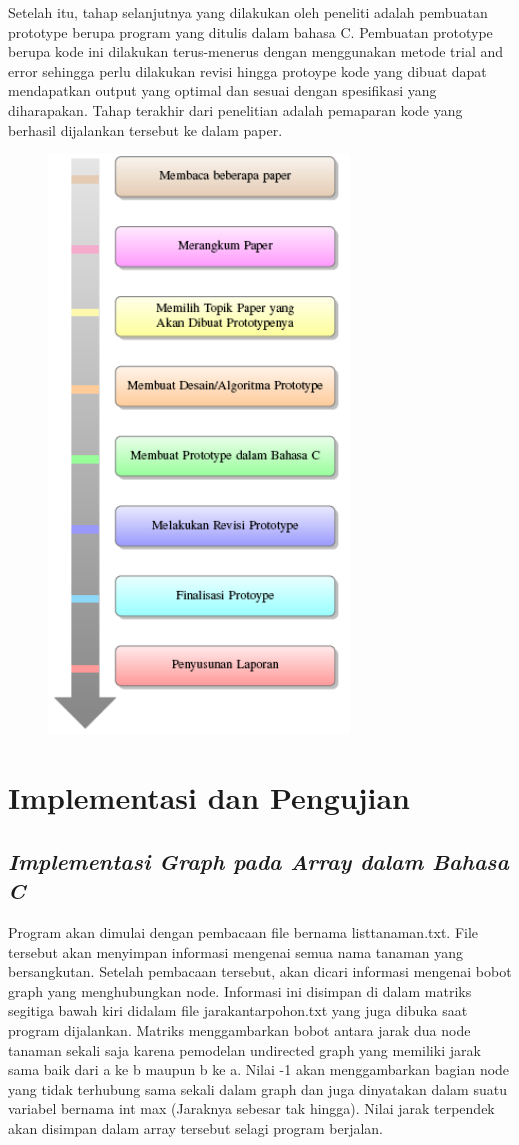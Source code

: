\documentclass[conference]{IEEEtran}
\begin{document}
Setelah itu, tahap selanjutnya yang dilakukan oleh peneliti
adalah pembuatan prototype berupa program yang ditulis
dalam bahasa C. Pembuatan prototype berupa kode ini dilakukan
terus-menerus dengan menggunakan metode trial and
error sehingga perlu dilakukan revisi hingga protoype kode
yang dibuat dapat mendapatkan output yang optimal dan
sesuai dengan spesifikasi yang diharapakan. Tahap terakhir
dari penelitian adalah pemaparan kode yang berhasil dijalankan
tersebut ke dalam paper.
\begin{figure}[htbp]
\centerline{\includegraphics[width=8cm]{tes.png}}
\label{fig}
\end{figure}

\section{Implementasi dan Pengujian}
\subsection{\textit{Implementasi Graph pada Array dalam Bahasa C}}
Program akan dimulai dengan pembacaan file bernama
listtanaman.txt. File tersebut akan menyimpan informasi mengenai
semua nama tanaman yang bersangkutan. Setelah pembacaan
tersebut, akan dicari informasi mengenai bobot graph
yang menghubungkan node. Informasi ini disimpan di dalam
matriks segitiga bawah kiri didalam file jarakantarpohon.txt
yang juga dibuka saat program dijalankan. Matriks menggambarkan
bobot antara jarak dua node tanaman sekali saja karena
pemodelan undirected graph yang memiliki jarak sama baik
dari a ke b maupun b ke a. Nilai -1 akan menggambarkan
bagian node yang tidak terhubung sama sekali dalam graph
dan juga dinyatakan dalam suatu variabel bernama int max
(Jaraknya sebesar tak hingga). Nilai jarak terpendek akan
disimpan dalam array tersebut selagi program berjalan.
\end{document}
